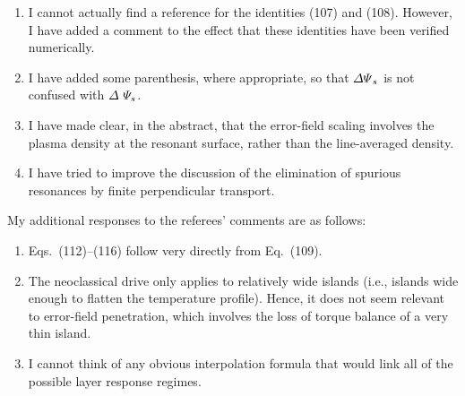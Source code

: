 \documentclass{article}[12pt]
\begin{document}
\begin{enumerate}
\item I cannot actually find a reference for the identities (107) and (108). However, I have added a
comment to the effect that these identities have been verified numerically.
\item I have added some parenthesis, where appropriate, so that ${\mit\Delta\Psi}_s$ is not confused with
${\mit\Delta}\,\,{\mit\Psi}_s$.
\item I have made clear, in the abstract, that the error-field scaling involves the plasma density at the
resonant surface, rather than the line-averaged density. 
\item I have tried to improve the discussion of the elimination of spurious resonances by finite perpendicular transport. 
\end{enumerate}

My additional responses to the referees' comments are as follows:
\begin{enumerate}
\item Eqs.~(112)--(116) follow very directly from Eq.~(109). 
\item The neoclassical drive only applies to relatively wide islands (i.e., islands wide enough to flatten the
temperature profile). Hence, it does not seem relevant to error-field penetration, which involves the loss
of torque balance of a very thin island. 
\item I cannot think of any obvious interpolation formula that would link all of the possible layer response regimes.
\end{enumerate}
\end{document}
